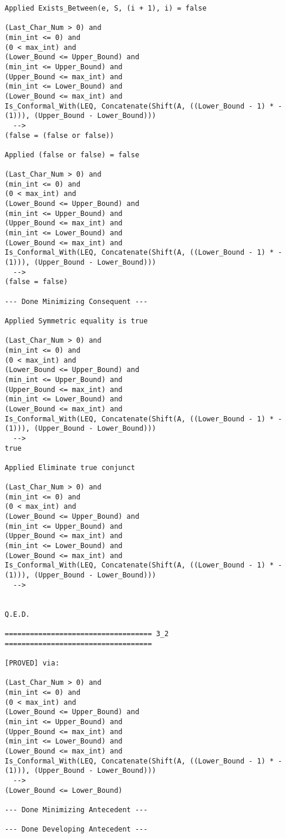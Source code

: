 \begin{lstlisting}[language=resolve]
Applied Exists_Between(e, S, (i + 1), i) = false

(Last_Char_Num > 0) and
(min_int <= 0) and
(0 < max_int) and
(Lower_Bound <= Upper_Bound) and
(min_int <= Upper_Bound) and
(Upper_Bound <= max_int) and
(min_int <= Lower_Bound) and
(Lower_Bound <= max_int) and
Is_Conformal_With(LEQ, Concatenate(Shift(A, ((Lower_Bound - 1) * -(1))), (Upper_Bound - Lower_Bound)))
  -->
(false = (false or false))

Applied (false or false) = false

(Last_Char_Num > 0) and
(min_int <= 0) and
(0 < max_int) and
(Lower_Bound <= Upper_Bound) and
(min_int <= Upper_Bound) and
(Upper_Bound <= max_int) and
(min_int <= Lower_Bound) and
(Lower_Bound <= max_int) and
Is_Conformal_With(LEQ, Concatenate(Shift(A, ((Lower_Bound - 1) * -(1))), (Upper_Bound - Lower_Bound)))
  -->
(false = false)

--- Done Minimizing Consequent ---

Applied Symmetric equality is true

(Last_Char_Num > 0) and
(min_int <= 0) and
(0 < max_int) and
(Lower_Bound <= Upper_Bound) and
(min_int <= Upper_Bound) and
(Upper_Bound <= max_int) and
(min_int <= Lower_Bound) and
(Lower_Bound <= max_int) and
Is_Conformal_With(LEQ, Concatenate(Shift(A, ((Lower_Bound - 1) * -(1))), (Upper_Bound - Lower_Bound)))
  -->
true

Applied Eliminate true conjunct

(Last_Char_Num > 0) and
(min_int <= 0) and
(0 < max_int) and
(Lower_Bound <= Upper_Bound) and
(min_int <= Upper_Bound) and
(Upper_Bound <= max_int) and
(min_int <= Lower_Bound) and
(Lower_Bound <= max_int) and
Is_Conformal_With(LEQ, Concatenate(Shift(A, ((Lower_Bound - 1) * -(1))), (Upper_Bound - Lower_Bound)))
  -->


Q.E.D.

=================================== 3_2 ===================================

[PROVED] via:

(Last_Char_Num > 0) and
(min_int <= 0) and
(0 < max_int) and
(Lower_Bound <= Upper_Bound) and
(min_int <= Upper_Bound) and
(Upper_Bound <= max_int) and
(min_int <= Lower_Bound) and
(Lower_Bound <= max_int) and
Is_Conformal_With(LEQ, Concatenate(Shift(A, ((Lower_Bound - 1) * -(1))), (Upper_Bound - Lower_Bound)))
  -->
(Lower_Bound <= Lower_Bound)

--- Done Minimizing Antecedent ---

--- Done Developing Antecedent ---


\end{lstlisting}
